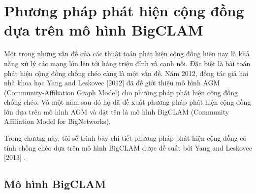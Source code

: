 \chapter{Phương pháp phát hiện cộng đồng dựa trên mô hình BigCLAM}\label{chap:c3}
\ifpdf
    \graphicspath{{Chapter3/Chapter3Figs/PNG/}{Chapter3/Chapter3Figs/PDF/}{Chapter3/Chapter3Figs/}}
\else
    \graphicspath{{Chapter3/Chapter3Figs/EPS/}{Chapter3/Chapter3Figs/}}
\fi
Một trong những vấn đề của các thuật toán phát hiện cộng đồng hiện nay là khả năng xử lý các mạng lớn lên tới hàng triệu đỉnh và cạnh nối. Đặc biệt là bài toán phát hiện cộng đồng chồng chéo càng là một vấn đề. Năm 2012, đồng tác giả hai nhà khoa học Yang and Leskovec
[2012] \cite{yang2012community} đã đề giới thiệu mô hình AGM (Community-Affiliation Graph Model) cho phướng pháp phát hiện cộng đồng chồng chéo. Và một năm sau đó họ đã đề xuất phương pháp phát hiện cộng đồng lớn dựa trên mô hình AGM và đặt tên là mô hình BigCLAM (Community Affiliation Model for BigNetworks).

Trong chương này, tôi sẽ trình bày chi tiết phương pháp phát hiện cộng đồng có tính chồng chéo dựa trên mô hình BigCLAM được đề suất bởi Yang and Leskovec [2013] \cite{yang2013overlapping}. 

\section{Mô hình BigCLAM}

